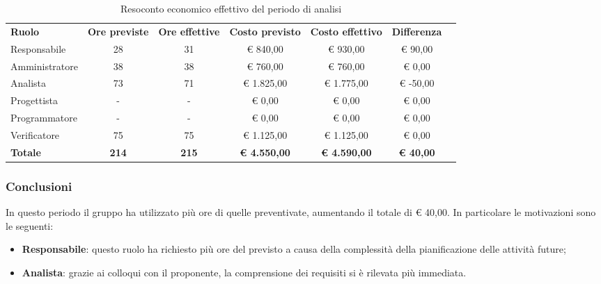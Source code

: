 \documentclass[../piano-di-progetto.tex]{subfiles}
\begin{document}
  \begin{table}[H]
    \centering
    \begin{tabular}{lcccccc}
      \rowcolor{lightgray}
      \textbf{Ruolo}  & \textbf{Ore previste} & \textbf{Ore effettive} & \textbf{Costo previsto} & \textbf{Costo effettivo} & \textbf{Differenza} \\
      Responsabile    & 28                    & 31                     & € 840,00                & € 930,00                 & € 90,00    \\
      Amministratore  & 38                    & 38                     & € 760,00                & € 760,00                 & € 0,00     \\
      Analista        & 73                    & 71                     & € 1.825,00              & € 1.775,00               & € -50,00   \\
      Progettista     & -                     & -                      & € 0,00                  & € 0,00                   & € 0,00     \\
      Programmatore   & -                     & -                      & € 0,00                  & € 0,00                   & € 0,00     \\
      Verificatore    & 75                    & 75                     & € 1.125,00              & € 1.125,00               & € 0,00     \\
      \textbf{Totale} & \textbf{214}          & \textbf{215}           & \textbf{€ 4.550,00}     & \textbf{€ 4.590,00}      & \textbf{€ 40,00}   
      
    \end{tabular}
    \caption{Resoconto economico effettivo del periodo di analisi}
  \end{table}


\subsubsection{Conclusioni}
In questo periodo il gruppo ha utilizzato più ore di quelle preventivate, aumentando il totale di € 40,00. In particolare le motivazioni sono le seguenti:
\begin{itemize}
    \item \textbf{Responsabile}: questo ruolo ha richiesto più ore del previsto a causa della complessità della pianificazione delle attività future;
    
 \item   \textbf{Analista}: grazie ai colloqui con il proponente, la comprensione dei requisiti si è rilevata più immediata.
\end{itemize}
\end{document}

